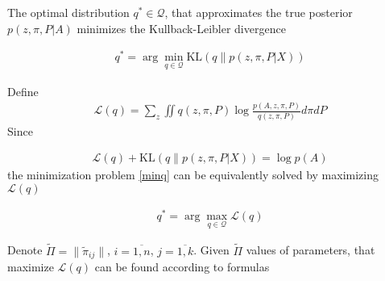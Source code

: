 The optimal distribution $q^* \in \mathcal Q$, that approximates the true posterior $p(z, \pi, P | A)$ minimizes the Kullback-Leibler divergence

\begin{equation}
    \begin{aligned}
    \label{minq}
    q^* = \arg\min\limits_{q \in \mathcal Q} \text{KL} \left( q \| p(z, \pi, P | X) \right)
    \end{aligned}
\end{equation}

Define
\begin{equation}
    \begin{aligned}
    \mathcal L(q) = \sum\limits_z \iint q(z, \pi, P) \log \frac{p(A, z, \pi, P)}{q(z, \pi, P)} d\pi dP
    \end{aligned}
\end{equation}
Since

\begin{equation}
    \begin{aligned}
    \nonumber
    \mathcal L(q) + \text{KL} \left( q \| p(z, \pi, P | X) \right) = \log p(A)
    \end{aligned}
\end{equation}
the minimization problem \ref{minq} can be equivalently solved by maximizing $\mathcal L(q)$

\begin{equation}
    \begin{aligned}
    \label{maxq}
    q^* = \arg\max\limits_{q \in \mathcal Q} \mathcal L(q)
    \end{aligned}
\end{equation}

Denote $\tilde\Pi = \| \tilde\pi_{ij} \|$, $i = \overline{1, n}$, $j = \overline{1, k}$.
Given $\tilde\Pi$ values of parameters, that maximize $\mathcal L(q)$ can be found according to formulas

